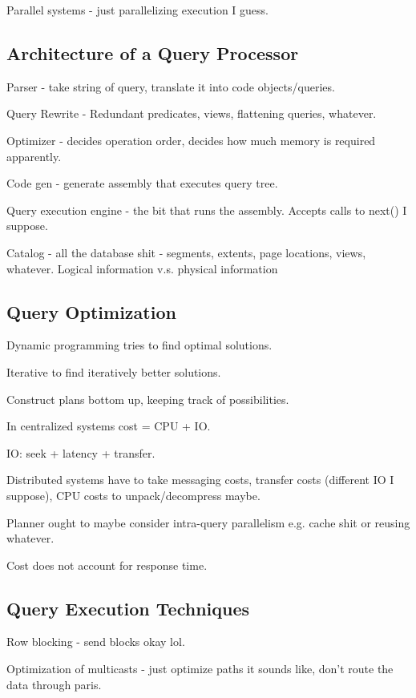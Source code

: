 \documentclass{article}
\begin{document}
	Parallel systems - just parallelizing execution I guess.
	
	\subsection{Architecture of a Query Processor}
	
		Parser - take string of query, translate it into code objects/queries.
		
		Query Rewrite - Redundant predicates, views, flattening queries, whatever.
		
		Optimizer - decides operation order, decides how much memory is required apparently.
		
		Code gen - generate assembly that executes query tree.
		
		Query execution engine - the bit that runs the assembly. Accepts calls to next() I suppose.
		
		Catalog - all the database shit - segments, extents, page locations, views, whatever. Logical information v.s. physical information
		
	\subsection{Query Optimization}
	
		Dynamic programming tries to find optimal solutions.
		
		Iterative to find iteratively better solutions.
		
		Construct plans bottom up, keeping track of possibilities.
		
		In centralized systems cost = CPU + IO.
		
		IO: seek + latency + transfer.
		
		Distributed systems have to take messaging costs, transfer costs (different IO I suppose), CPU costs to unpack/decompress maybe.
		
		Planner ought to maybe consider intra-query parallelism e.g. cache shit or reusing whatever.
		
		Cost does not account for response time.
		
	\subsection{Query Execution Techniques}
	
		Row blocking - send blocks okay lol.
		
		Optimization of multicasts - just optimize paths it sounds like, don't route the data through paris.
		
\end{document}
